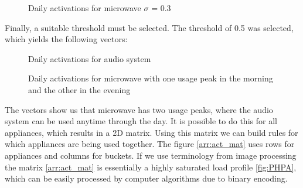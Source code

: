 \begin{figure}[H]
    \centering
    \caption{Daily activations for microwave $\sigma$ = 0.3}
    \label{arr:microwave_acts_norm}
\end{figure}

Finally, a suitable threshold must be selected.
The threshold of 0.5 was selected, which yields the following vectors:

\begin{figure}[H]
    \centering
    \caption{Daily activations for audio system}
    \label{arr:as_acts_vec}
\end{figure}

\begin{figure}[H]
    \centering
    \caption{Daily activations for microwave with one usage peak in the morning and the other in the evening}
    \label{arr:microwave_acts_vec}
\end{figure}

The vectors show us that microwave has two usage peaks, where the audio system can be used anytime through the day.
It is possible to do this for all appliances, which results in a 2D matrix. 
Using this matrix we can build rules for which appliances are being used together.
The figure \ref{arr:act_mat} uses rows for appliances and columns for buckets.  
If we use terminology from image processing the matrix \ref{arr:act_mat} is essentially a highly saturated load profile \ref{fig:PHPA},
which can be easily processed by computer algorithms due to binary encoding. 


